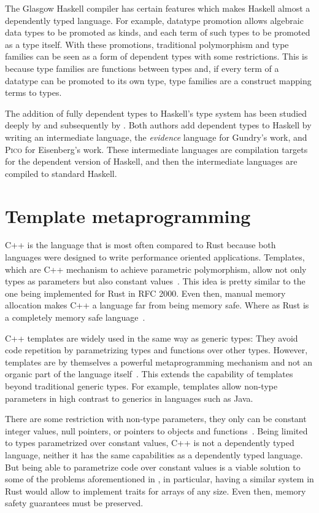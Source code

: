 The Glasgow Haskell compiler has certain features which makes Haskell almost a
dependently typed language. For example, datatype promotion allows algebraic
data types to be promoted as kinds, and each term of such types to be promoted
as a type itself. With these promotions, traditional polymorphism and type
families can be seen as a form of dependent types with some restrictions. This
is because type families are functions between types and, if every term of a
datatype can be promoted to its own type, type families are a construct mapping
terms to types.

The addition of fully dependent types to Haskell's type system has been studied
deeply by \citet{gundry} and subsequently by \citet{eisenberg}. Both authors
add dependent types to Haskell by writing an intermediate language, the
\textit{evidence} language for Gundry's work, and \textsc{Pico} for Eisenberg's
work.  These intermediate languages are compilation targets for the dependent
version of Haskell, and then the intermediate languages are compiled to
standard Haskell. 


\section{Template metaprogramming}

C++ is the language that is most often compared to Rust because both languages
were designed to write performance oriented applications. Templates, which are
C++ mechanism to achieve parametric polymorphism, allow not only types as
parameters but also constant values~\cite{templates}. This idea is pretty
similar to the one being implemented for Rust in RFC 2000. Even then, manual
memory allocation makes C++ a language far from being memory safe. Where as Rust
is a completely memory safe language~\cite{ralf}.    

C++ templates are widely used in the same way as generic types: They avoid code
repetition by parametrizing types and functions over other types. However,
templates are by themselves a powerful metaprogramming mechanism and not an
organic part of the language itself~\cite{template_metaprogramming}. This
extends the capability of templates beyond traditional generic types. For
example, templates allow non-type parameters in high contrast to generics in
languages such as Java.

There are some restriction with non-type parameters, they only can be constant
integer values, null pointers, or pointers to objects and
functions~\cite{templates}. Being limited to types parametrized over constant
values, C++ is not a dependently typed language, neither it has the same
capabilities as a dependently typed language. But being able to parametrize code
over constant values is a viable solution to some of the problems aforementioned
in , in particular, having a similar system in
Rust would allow to implement traits for arrays of any size. Even then, memory
safety guarantees must be preserved.

